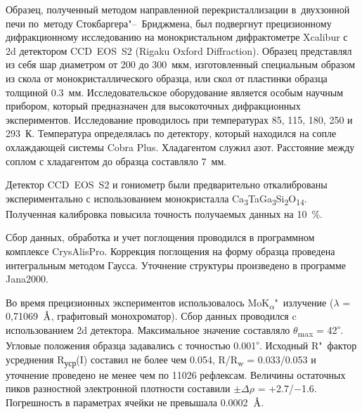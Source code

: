 Образец, полученный методом направленной перекристаллизации в~двухзонной печи по~методу Стокбаргера"--~Бриджмена, был подвергнут прецизионному дифракционному исследованию на монокристальном дифрактометре Xcalibur с 2d детектором CCD~EOS~S2 (Rigaku Oxford Diffraction). Образец представлял из себя шар диаметром от 200 до 300~мкм, изготовленный специальным образом из скола от монокристаллического образца, или скол от пластинки образца толщиной 0.3~мм. Исследовательское оборудование является особым научным прибором, который предназначен для высокоточных дифракционных экспериментов. Исследование проводилось при температурах 85, 115, 180, 250 и 293~К\cite{Dudka2016}. Температура определялась по детектору, который находился на сопле охлаждающей системы Cobra Plus. Хладагентом служил азот. Расстояние между соплом с хладагентом до образца составляло 7~мм.

Детектор CCD~EOS~S2 и гониометр были предварительно откалиброваны экспериментально\cite{Dudka2010} с использованием монокристалла Ca\textsubscript{3}TaGa\textsubscript{3}Si\textsubscript{2}O\textsubscript{14}\cite{Dudka2016_b}. Полученная калибровка повысила точность получаемых данных на 10~\%.

Сбор данных, обработка и учет поглощения проводился в программном комплексе  CrysAlisPro. Коррекция поглощения на форму образца проведена интегральным методом Гаусса. Уточнение структуры произведено в программе Jana2000\cite{Dusek2001}.






Во время прецизионных  экспериментов использовалось MoK\textsubscript{$\alpha$}"~излучение ($\lambda$ = 0,71069~${\mbox{\normalfont\AA}}$, графитовый монохроматор). Сбор данных проводился c использованием 2d детектора. Максимальное значение составляло $\theta$\textsubscript{max} = 42\textsuperscript{$\circ$}.
Угловые положения образца задавались с точностью 0.001\textsuperscript{$\circ$}.
Исходный R"~фактор усреднения R\textsubscript{уср}(I) составил не более чем 0.054, R/R\textsubscript{w} = 0.033/0.053 и уточнение проведено не менее чем по 11026 рефлексам.
Величины остаточных пиков разностной электронной плотности составили $\pm\Delta$$\rho$ = +2.7/$-$1.6.
Погрешность в параметрах ячейки не превышала 0.0002~{$\mbox{\normalfont\AA}$}.

